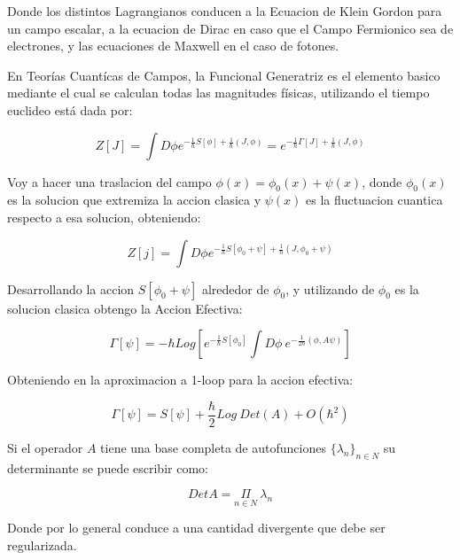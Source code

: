 Donde los distintos Lagrangianos conducen a la Ecuacion de Klein Gordon para un campo escalar, a la ecuacion de Dirac en caso que el Campo Fermionico sea de electrones, y las ecuaciones de Maxwell en el caso de fotones.

En Teorías Cuantícas de Campos, la Funcional Generatriz es el elemento basico mediante el cual se calculan todas las magnitudes físicas, utilizando el tiempo euclideo está dada por:

\begin{equation}
Z[J] = 
\int D \phi
e^{-\frac{1}{\hbar} S[\phi] + \frac{1}{\hbar} (J,\phi) }  =
e ^{-\frac{1}{\hbar} \Gamma[J] + \frac{1}{\hbar} (J,\phi )} 
\end{equation}

Voy a hacer una traslacion del campo $\phi (x) = \phi _0 (x) + \psi (x) $, donde $\phi _0 (x)$ es la solucion que extremiza la accion clasica y $\psi (x)$ es la fluctuacion cuantica respecto a esa solucion, obteniendo:

\begin{equation}
Z[j] = 
\int D \phi
e^{-\frac{1}{\hbar} S[\phi _0 + \psi] + \frac{1}{\hbar} (J,\phi _0 + \psi ) }  
\end{equation}

Desarrollando la accion $S[\phi _0 + \psi]$ alrededor de $\phi _0$, y utilizando de $\phi _0$ es la solucion clasica obtengo la Accion Efectiva:

\begin{equation}
\Gamma [\psi] = 
- \hbar 
Log
\left[
	e ^{-\frac{1}{\hbar} S[\phi _0] }
	\int D \phi \
	e ^{-\frac{1}{2 \hbar} (\phi,A \psi) }
	\right]
\end{equation}



Obteniendo en la aproximacion a 1-loop para la accion efectiva:

\begin{equation}
\Gamma [\psi] = S [\psi] + \frac{\hbar}{2} Log \ Det (A) +
O ( \hbar ^2 )
\end{equation}


Si el operador $A$ tiene una base completa de autofunciones $ \{ \lambda _n \} _{n \in N}$ su determinante se puede escribir como:

\begin{equation}
Det A = \underset{ n \in N }{ \Pi } \ \lambda _n
\end{equation}

Donde por lo general conduce a una cantidad divergente que debe ser regularizada.\\


